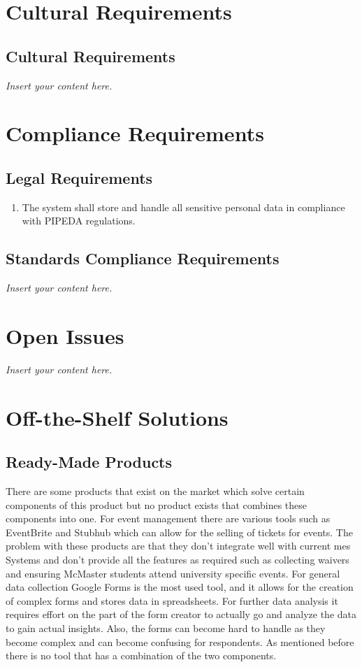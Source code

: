 \documentclass[12pt]{article}
\newcommand{\lips}{\textit{Insert your content here.}}
\begin{document}
\section{Cultural Requirements}
\subsection{Cultural Requirements}
\lips

\section{Compliance Requirements}
\subsection{Legal Requirements}
\begin{enumerate}[align=left,
  leftmargin=*,
  labelsep=1em,
  itemindent=0em,
  label=\bfseries LG-\arabic*:]
  \item The system shall store and handle all sensitive personal data in compliance with
    PIPEDA regulations.
\end{enumerate}
\subsection{Standards Compliance Requirements}
\lips

\section{Open Issues}
\lips
\section{Off-the-Shelf Solutions}
\subsection{Ready-Made Products}
There are some products that exist on the market which solve certain components of this product but no product exists
that combines these components into one. For event management there are various tools such as EventBrite and Stubhub
which can allow for the selling of tickets for events. The problem with these products are that they don't integrate
well with current \gls{mes} Systems and don't provide all the features as required such as collecting waivers and
ensuring McMaster students attend university specific events. For general data collection Google Forms is the most used
tool, and it allows for the creation of complex forms and stores data in spreadsheets. For further data analysis it
requires effort on the part of the form creator to actually go and analyze the data to gain actual insights. Also, the
forms can become hard to handle as they become complex and can become confusing for respondents. As mentioned before
there is no tool that has a combination of the two components.
\end{document}
